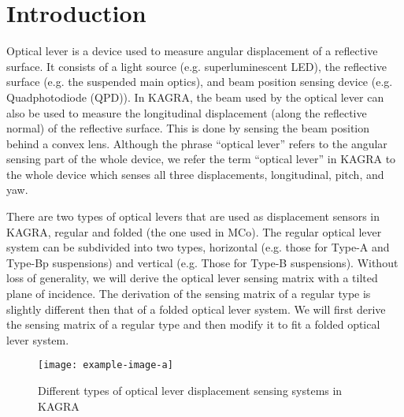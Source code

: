 \section{Introduction}
Optical lever is a device used to measure angular displacement of a reflective surface. \cite{bs_sr_tm_optical}
It consists of a light source (e.g. superluminescent LED), the reflective surface (e.g. the suspended main optics), and beam position sensing device (e.g. Quadphotodiode (QPD)).
In KAGRA, the beam used by the optical lever can also be used to measure the longitudinal displacement (along the reflective normal) of the reflective surface.
This is done by sensing the beam position behind a convex lens.
Although the phrase ``optical lever'' refers to the angular sensing part of the whole device, we refer the term ``optical lever'' in KAGRA to the whole device which senses all three displacements, longitudinal, pitch, and yaw.

There are two types of optical levers that are used as displacement sensors in KAGRA, regular and folded (the one used in MCo).
The regular optical lever system can be subdivided into two types, horizontal (e.g. those for Type-A and Type-Bp suspensions) and vertical (e.g. Those for Type-B suspensions).
Without loss of generality, we will derive the optical lever sensing matrix with a tilted plane of incidence.
The derivation of the sensing matrix of a regular type is slightly different then that of a folded optical lever system.
We will first derive the sensing matrix of a regular type and then modify it to fit a folded optical lever system.

\begin{figure}[!h]
	\centering
	\texttt{[image: example-image-a]}
	\caption{Different types of optical lever displacement sensing systems in KAGRA}
	\label{fig:different_types_of_optical_levers}
\end{figure}
